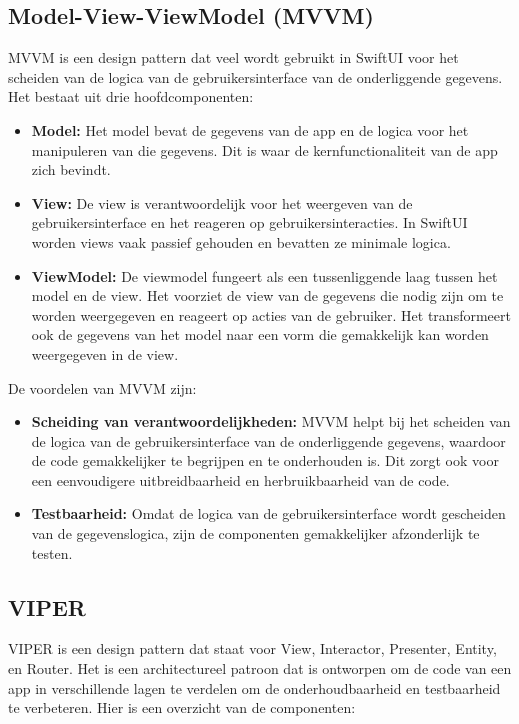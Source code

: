 \subsection{Model-View-ViewModel (MVVM)}
\autocite{MediumMVVM} MVVM is een design pattern dat veel wordt gebruikt in SwiftUI voor het scheiden van de logica van de gebruikersinterface van de onderliggende gegevens. Het bestaat uit drie hoofdcomponenten:
\begin{itemize}
    \item {\textbf{Model:} Het model bevat de gegevens van de app en de logica voor het manipuleren van die gegevens. Dit is waar de kernfunctionaliteit van de app zich bevindt.}
    \item {\textbf{View:} De view is verantwoordelijk voor het weergeven van de gebruikersinterface en het reageren op gebruikersinteracties. In SwiftUI worden views vaak passief gehouden en bevatten ze minimale logica.}
    \item {\textbf{ViewModel:} De viewmodel fungeert als een tussenliggende laag tussen het model en de view. Het voorziet de view van de gegevens die nodig zijn om te worden weergegeven en reageert op acties van de gebruiker. Het transformeert ook de gegevens van het model naar een vorm die gemakkelijk kan worden weergegeven in de view.}
\end{itemize}
De voordelen van MVVM zijn:
\begin{itemize}
    \item {\textbf{Scheiding van verantwoordelijkheden:} MVVM helpt bij het scheiden van de logica van de gebruikersinterface van de onderliggende gegevens, waardoor de code gemakkelijker te begrijpen en te onderhouden is. Dit zorgt ook voor een eenvoudigere uitbreidbaarheid en herbruikbaarheid van de code.}
    \item {\textbf{Testbaarheid:} Omdat de logica van de gebruikersinterface wordt gescheiden van de gegevenslogica, zijn de componenten gemakkelijker afzonderlijk te testen.}
\end{itemize}

\subsection{VIPER}
\autocite{MediumVIPER} VIPER is een design pattern dat staat voor View, Interactor, Presenter, Entity, en Router. Het is een architectureel patroon dat is ontworpen om de code van een app in verschillende lagen te verdelen om de onderhoudbaarheid en testbaarheid te verbeteren. Hier is een overzicht van de componenten:

